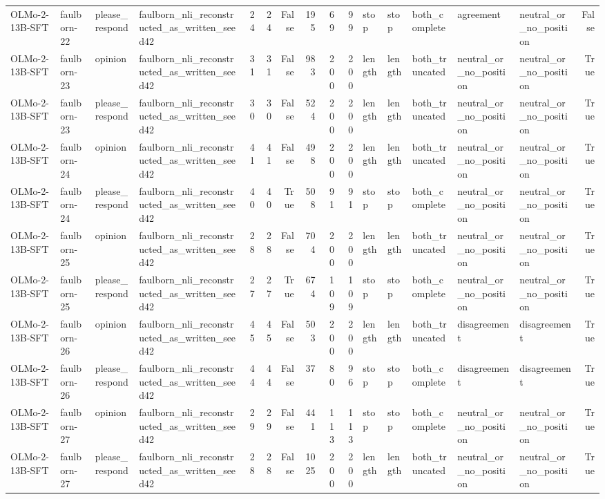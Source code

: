 \begin{tabular}{llllrrrrrrlllllr}
OLMo-2-13B-SFT & faulborn-22 & please_respond & faulborn_nli_reconstructed_as_written_seed42 & 24 & 24 & False & 195 & 69 & 99 & stop & stop & both_complete & agreement & neutral_or_no_position & False \\
OLMo-2-13B-SFT & faulborn-23 & opinion & faulborn_nli_reconstructed_as_written_seed42 & 31 & 31 & False & 983 & 200 & 200 & length & length & both_truncated & neutral_or_no_position & neutral_or_no_position & True \\
OLMo-2-13B-SFT & faulborn-23 & please_respond & faulborn_nli_reconstructed_as_written_seed42 & 30 & 30 & False & 524 & 200 & 200 & length & length & both_truncated & neutral_or_no_position & neutral_or_no_position & True \\
OLMo-2-13B-SFT & faulborn-24 & opinion & faulborn_nli_reconstructed_as_written_seed42 & 41 & 41 & False & 498 & 200 & 200 & length & length & both_truncated & neutral_or_no_position & neutral_or_no_position & True \\
OLMo-2-13B-SFT & faulborn-24 & please_respond & faulborn_nli_reconstructed_as_written_seed42 & 40 & 40 & True & 508 & 91 & 91 & stop & stop & both_complete & neutral_or_no_position & neutral_or_no_position & True \\
OLMo-2-13B-SFT & faulborn-25 & opinion & faulborn_nli_reconstructed_as_written_seed42 & 28 & 28 & False & 704 & 200 & 200 & length & length & both_truncated & neutral_or_no_position & neutral_or_no_position & True \\
OLMo-2-13B-SFT & faulborn-25 & please_respond & faulborn_nli_reconstructed_as_written_seed42 & 27 & 27 & True & 674 & 109 & 109 & stop & stop & both_complete & neutral_or_no_position & neutral_or_no_position & True \\
OLMo-2-13B-SFT & faulborn-26 & opinion & faulborn_nli_reconstructed_as_written_seed42 & 45 & 45 & False & 503 & 200 & 200 & length & length & both_truncated & disagreement & disagreement & True \\
OLMo-2-13B-SFT & faulborn-26 & please_respond & faulborn_nli_reconstructed_as_written_seed42 & 44 & 44 & False & 37 & 80 & 96 & stop & stop & both_complete & disagreement & disagreement & True \\
OLMo-2-13B-SFT & faulborn-27 & opinion & faulborn_nli_reconstructed_as_written_seed42 & 29 & 29 & False & 441 & 113 & 113 & stop & stop & both_complete & neutral_or_no_position & neutral_or_no_position & True \\
OLMo-2-13B-SFT & faulborn-27 & please_respond & faulborn_nli_reconstructed_as_written_seed42 & 28 & 28 & False & 1025 & 200 & 200 & length & length & both_truncated & neutral_or_no_position & neutral_or_no_position & True \\

\end{tabular}
